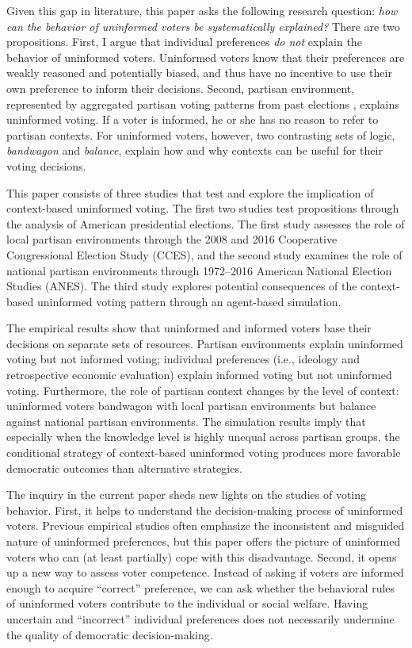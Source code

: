 \documentclass[letterpaper, 12pt]{article}
\begin{document}
    \par Given this gap in literature, this paper asks the following research question: \textit{how can the behavior of uninformed voters be systematically explained?} There are two propositions. First, I argue that individual preferences \textit{do not} explain the behavior of uninformed voters. Uninformed voters know that their preferences are weakly reasoned and potentially biased, and thus have no incentive to use their own preference to inform their decisions. Second, partisan environment, represented by aggregated partisan voting patterns from past elections \citep{Miller1956onpo, Putnam1966poat}, explains uninformed voting. If a voter is informed, he or she has no reason to refer to partisan contexts. For uninformed voters, however, two contrasting sets of logic, \textit{bandwagon} and \textit{balance}, explain how and why contexts can be useful for their voting decisions.
    
    \par This paper consists of three studies that test and explore the implication of context-based uninformed voting. The first two studies test propositions through the analysis of American presidential elections. The first study assesses the role of local partisan environments through the 2008 and 2016 Cooperative Congressional Election Study (CCES), and the second study examines the role of national partisan environments through 1972--2016 American National Election Studies (ANES). The third study explores potential consequences of the context-based uninformed voting pattern through an agent-based simulation.
    
    \par The empirical results show that uninformed and informed voters base their decisions on separate sets of resources. Partisan environments explain uninformed voting but not informed voting; individual preferences (i.e., ideology and retrospective economic evaluation) explain informed voting but not uninformed voting. Furthermore, the role of partisan context changes by the level of context: uninformed voters bandwagon with local partisan environments but balance against national partisan environments. The simulation results imply that especially when the knowledge level is highly unequal across partisan groups, the conditional strategy of context-based uninformed voting produces more favorable democratic outcomes than alternative strategies.
    
    \par The inquiry in the current paper sheds new lights on the studies of voting behavior. First, it helps to understand the decision-making process of uninformed voters. Previous empirical studies often emphasize the inconsistent and misguided nature of uninformed preferences, but this paper offers the picture of uninformed voters who can (at least partially) cope with this disadvantage. Second, it opens up a new way to assess voter competence. Instead of asking if voters are informed enough to acquire ``correct'' preference, we can ask whether the behavioral rules of uninformed voters contribute to the individual or social welfare. Having uncertain and ``incorrect'' individual preferences does not necessarily undermine the quality of democratic decision-making.
    
\end{document}
